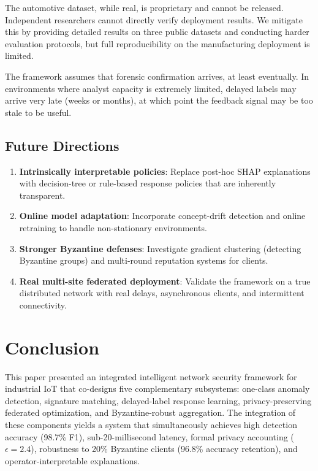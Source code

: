 \documentclass[preprint,12pt]{elsarticle}
\begin{document}
The automotive dataset, while real, is proprietary and cannot be released. Independent researchers cannot directly verify deployment results. We mitigate this by providing detailed results on three public datasets and conducting harder evaluation protocols, but full reproducibility on the manufacturing deployment is limited.

The framework assumes that forensic confirmation arrives, at least eventually. In environments where analyst capacity is extremely limited, delayed labels may arrive very late (weeks or months), at which point the feedback signal may be too stale to be useful.

\subsection{Future Directions}

\begin{enumerate}[label=(\roman*),leftmargin=1.2em]
    \item \textbf{Intrinsically interpretable policies}: Replace post-hoc SHAP explanations with decision-tree or rule-based response policies that are inherently transparent.
    
    \item \textbf{Online model adaptation}: Incorporate concept-drift detection and online retraining to handle non-stationary environments.
    
    \item \textbf{Stronger Byzantine defenses}: Investigate gradient clustering (detecting Byzantine groups) and multi-round reputation systems for clients.
    
    \item \textbf{Real multi-site federated deployment}: Validate the framework on a true distributed network with real delays, asynchronous clients, and intermittent connectivity.
\end{enumerate}

\section{Conclusion}
\label{sec:conclusion}

This paper presented an integrated intelligent network security framework for industrial IoT that co-designs five complementary subsystems: one-class anomaly detection, signature matching, delayed-label response learning, privacy-preserving federated optimization, and Byzantine-robust aggregation. The integration of these components yields a system that simultaneously achieves high detection accuracy (98.7\% F1), sub-20-millisecond latency, formal privacy accounting ($\epsilon = 2.4$), robustness to 20\% Byzantine clients (96.8\% accuracy retention), and operator-interpretable explanations.
\end{document}
